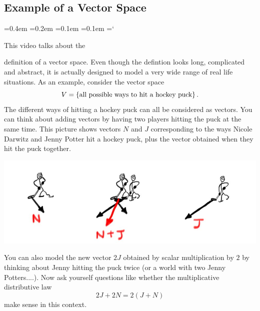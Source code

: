 
\subsection*{Example of a Vector Space}

{\ttfamily
{}\font=0.4em
\font=0.2em
\font=0.1em
\font=0.1em
\hyphenchar\font=`\-


\hypertarget{scripts_vector_spaces_example}{This video talks about the} definition  of
a vector space. Even though the defintion looks long, complicated and abstract, it is actually
designed to model a very wide range of real life situations. As an example, consider the vector space
\[
V=\{\mbox{\rm all possible ways to hit a hockey puck}\}\, .
\]
The different ways of hitting a hockey puck can all be considered as vectors. You can think about adding vectors
by having two players hitting the puck at the same time. This picture shows vectors $N$ and $J$ corresponding to the 
ways Nicole Darwitz and Jenny Potter hit a hockey puck, plus the vector obtained when they hit the puck together.
\begin{center}
\includegraphics[scale=.35]{hockey.jpg}
\end{center}
You can also model the new  vector $2J$ obtained by scalar multiplication by $2$ by thinking about Jenny hitting the puck twice
(or a world with two Jenny Potters....). Now ask yourself questions like whether the multiplicative distributive law
\[2J + 2N = 2(J+N)\]
make sense in this context.





}

